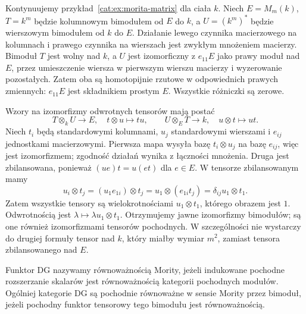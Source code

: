 \begin{przyklad}\label{cat:ex:morita-inverse-matrix}
Kontynuujemy przykład~\ref{cat:ex:morita-matrix} dla ciała $k$. Niech $E=M_m(k)$, $T=k^m$ będzie kolumnowym bimodułem od $E$ do $k$, a $U=(k^m)^*$ będzie wierszowym bimodułem od $k$ do $E$. Działanie lewego czynnika macierzowego na kolumnach i prawego czynnika na wierszach jest zwykłym mnożeniem macierzy. Bimoduł $T$ jest wolny nad $k$, a $U$ jest izomorficzny z $e_{11}E$ jako prawy moduł nad $E$, przez umieszczenie wiersza w pierwszym wierszu macierzy i wyzerowanie pozostałych. Zatem oba są homotopijnie rzutowe w odpowiednich prawych zmiennych: $e_{11}E$ jest składnikiem prostym $E$. Wszystkie różniczki są zerowe.

Wzory na izomorfizmy odwrotnych tensorów mają postać
\[
 T\otimes_k U\longrightarrow E,\quad t\otimes u\longmapsto tu,
 \qquad
 U\otimes_E T\longrightarrow k,\quad u\otimes t\longmapsto ut .
\]
Niech $t_i$ będą standardowymi kolumnami, $u_j$ standardowymi wierszami i $e_{ij}$ jednostkami macierzowymi. Pierwsza mapa wysyła bazę $t_i\otimes u_j$ na bazę $e_{ij}$, więc jest izomorfizmem; zgodność działań wynika z łączności mnożenia. Druga jest zbilansowana, ponieważ $(ue)t=u(et)$ dla $e\in E$. W tensorze zbilansowanym mamy
\[
 u_i\otimes t_j=(u_1e_{1i})\otimes t_j
   =u_1\otimes(e_{1i}t_j)=\delta_{ij}u_1\otimes t_1.
\]
Zatem wszystkie tensory są wielokrotnościami $u_1\otimes t_1$, którego obrazem jest $1$. Odwrotnością jest $\lambda\mapsto\lambda u_1\otimes t_1$. Otrzymujemy jawne izomorfizmy bimodułów; są one również izomorfizmami tensorów pochodnych. W szczególności nie wystarczy do drugiej formuły tensor nad $k$, który miałby wymiar $m^2$, zamiast tensora zbilansowanego nad $E$.
\end{przyklad}

\begin{definicja}\label{cat:def:morita-dg-equivalence}
Funktor DG nazywamy równoważnością Mority, jeżeli indukowane pochodne rozszerzanie skalarów jest równoważnością kategorii pochodnych modułów. Ogólniej kategorie DG są pochodnie równoważne w sensie Mority przez bimoduł, jeżeli pochodny funktor tensorowy tego bimodułu jest równoważnością.
\end{definicja}

